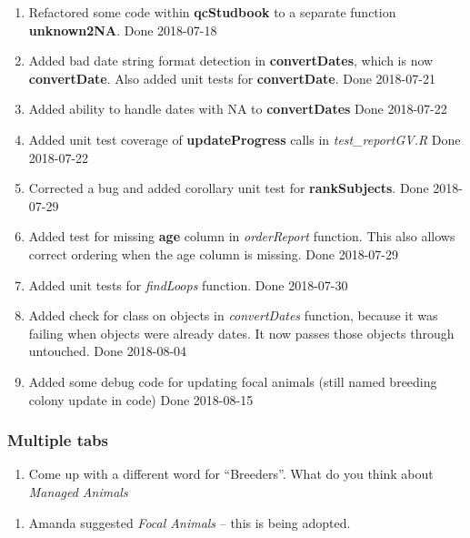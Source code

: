 \documentclass[
]{article}
\providecommand{\tightlist}{%
  \setlength{\itemsep}{0pt}\setlength{\parskip}{0pt}}
\begin{document}
\begin{enumerate}
\def\labelenumi{\arabic{enumi}.}
\setcounter{enumi}{2}
\tightlist
\item
  Refactored some code within \textbf{qcStudbook} to a separate function
  \textbf{unknown2NA}. Done 2018-07-18
\item
  Added bad date string format detection in \textbf{convertDates}, which
  is now \textbf{convertDate}. Also added unit tests for
  \textbf{convertDate}. Done 2018-07-21
\item
  Added ability to handle dates with NA to \textbf{convertDates} Done
  2018-07-22
\item
  Added unit test coverage of \textbf{updateProgress} calls in
  \emph{test\_reportGV.R} Done 2018-07-22
\item
  Corrected a bug and added corollary unit test for
  \textbf{rankSubjects}. Done 2018-07-29
\item
  Added test for missing \textbf{age} column in \emph{orderReport}
  function. This also allows correct ordering when the age column is
  missing. Done 2018-07-29
\item
  Added unit tests for \emph{findLoops} function. Done 2018-07-30
\item
  Added check for class on objects in \emph{convertDates} function,
  because it was failing when objects were already dates. It now passes
  those objects through untouched. Done 2018-08-04
\item
  Added some debug code for updating focal animals (still named breeding
  colony update in code) Done 2018-08-15
\end{enumerate}

\hypertarget{multiple-tabs}{%
\subsubsection{Multiple tabs}\label{multiple-tabs}}

\begin{enumerate}
\def\labelenumi{\arabic{enumi}.}
\tightlist
\item
  Come up with a different word for ``Breeders''. What do you think
  about \emph{Managed Animals}
\end{enumerate}

\begin{enumerate}
\def\labelenumi{\alph{enumi}.}
\tightlist
\item
  Amanda suggested \emph{Focal Animals} -- this is being adopted.
\end{enumerate}
\end{document}
